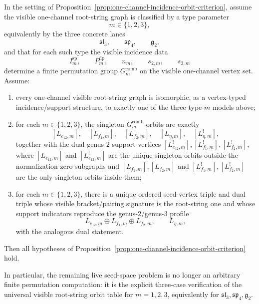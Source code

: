 \begin{proposition}\label{prop:one-channel-visible-orbit-table-criterion}
In the setting of
Proposition~\textup{\ref{prop:one-channel-incidence-orbit-criterion}},
assume the visible one-channel root-string graph is classified by a
type parameter
\[
m\in\{1,2,3\},
\]
equivalently by the three concrete lanes
\[
\mathfrak{sl}_3,\qquad \mathfrak{sp}_4,\qquad \mathfrak{g}_2,
\]
and that for each such type the visible incidence data
\[
I_m^{\mathrm{sp}},\qquad P_m^{\mathrm{dp}},\qquad n_m,\qquad
s_{2,m},\qquad s_{3,m}
\]
determine a finite permutation group
$G_m^{\mathrm{comb}}$ on the visible one-channel vertex set.  Assume:
\begin{enumerate}[label=\textup{(\roman*)}]
\item every one-channel visible root-string graph is isomorphic, as a
  vertex-typed incidence/support structure, to exactly one of the three
  type-$m$ models above;
\item for each
  $m\in\{1,2,3\}$, the singleton
  $G_m^{\mathrm{comb}}$-orbits are exactly
  \[
  [L_{e_{12},m}],\quad [L_{f_1,m}],\quad [L_{f_2,m}],\quad
  [L_{\eta,m}],\quad [L_{\eta,m}^!],
  \]
  together with the dual genus-$2$ support vertices
  $[L_{e_{12},m}^!], [L_{f_1,m}^!], [L_{f_2,m}^!]$, where
  $[L_{e_{12},m}]$ and $[L_{e_{12},m}^!]$ are the unique singleton
  orbits outside the normalization-zero subgraphs and
  $[L_{f_1,m}], [L_{f_2,m}]$ and
  $[L_{f_1,m}^!], [L_{f_2,m}^!]$ are the only singleton orbits inside
  them;
\item for each
  $m\in\{1,2,3\}$, there is a unique ordered seed-vertex triple and dual
  triple whose visible bracket/pairing signature is the root-string one
  and whose support indicators reproduce the genus-$2$/genus-$3$
  profile
  \[
  L_{e_{12},m}\oplus L_{f_1,m}\oplus L_{f_2,m},
  \qquad
  L_{\eta,m},
  \]
  with the analogous dual statement.
\end{enumerate}
Then all hypotheses of
Proposition~\ref{prop:one-channel-incidence-orbit-criterion} hold.

In particular, the remaining live seed-space problem is no longer an
arbitrary finite permutation computation: it is the explicit
three-case verification of the universal visible root-string orbit table
for
$m=1,2,3$, equivalently for
$\mathfrak{sl}_3,\mathfrak{sp}_4,\mathfrak{g}_2$.
\end{proposition}

